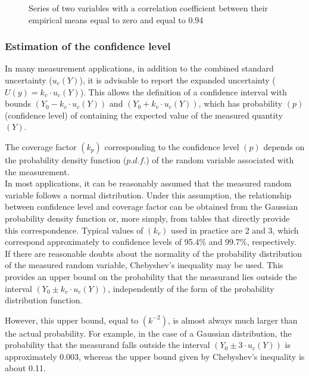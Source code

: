 \documentclass[../main.tex]{subfiles}
\begin{document}
\begin{figure}[h!]
\begin{center}
\end{center}
\caption{Series of two variables with a correlation coefficient between their empirical means equal to zero and equal to 0.94}	
\label{figure5}
\end{figure}


\subsubsection{Estimation of the confidence level}


In many measurement applications, in addition to the combined standard uncertainty ($u_c(Y)$), it is advisable to report the expanded uncertainty ($U(y) = k_v \cdot u_c(Y)$). 
This allows the definition of a confidence interval with bounds $(Y_0 - k_v \cdot u_c(Y))$ and $(Y_0 + k_v \cdot u_c(Y))$, which has probability $(p)$ (confidence level) of containing the expected value of the measured quantity $(Y)$. 

The coverage factor $(k_p)$ corresponding to the confidence level $(p)$ depends on the probability density function ($p.d.f.$) of the random variable associated with the measurement.\\

In most applications, it can be reasonably assumed that the measured random variable follows a normal distribution. 
Under this assumption, the relationship between confidence level and coverage factor can be obtained from the Gaussian probability density function or, more simply, from tables that directly provide this correspondence. Typical values of $(k_v)$ used in practice are 2 and 3, which correspond approximately to confidence levels of 95.4\% and 99.7\%, respectively.\\

If there are reasonable doubts about the normality of the probability distribution of the measured random variable, Chebyshev’s inequality may be used. This provides an upper bound on the probability that the measurand lies outside the interval $(Y_0 \pm k_v \cdot u_c(Y))$, independently of the form of the probability distribution function. 

However, this upper bound, equal to $(k^{-2})$, is almost always much larger than the actual probability. 
For example, in the case of a Gaussian distribution, the probability that the measurand falls outside the interval $(Y_0 \pm 3 \cdot u_c(Y))$ is approximately 0.003, whereas the upper bound given by Chebyshev’s inequality is about 0.11.\\
\end{document}
